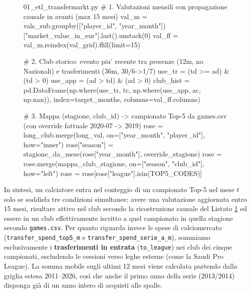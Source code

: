 \begin{figure}[!htb]
\centering
\begin{carbonwindow}{01\_etl\_transfermarkt.py}
# 1. Valutazioni mensili con propagazione causale in avanti (max 15 mesi)
val_m = vals_sub.groupby(["player_id", "year_month"])["market_value_in_eur"].last().unstack(0)
val_ff = val_m.reindex(val_grid).ffill(limit=15)

# 2. Club storico: evento piu' recente tra presenze (12m, no Nazionali) e trasferimenti (36m, 30/6->1/7)
use_tr = (td >= ad) & (td > 0)
use_app = (ad > td) & (ad > 0)
club_hist = pd.DataFrame(np.where(use_tr, tc, np.where(use_app, ac, np.nan)),
                         index=target_months, columns=val_ff.columns)

# 3. Mappa (stagione, club_id) -> campionato Top-5 da games.csv (con override fattuale 2020-07 -> 2019)
rose = long_club.merge(long_val, on=["year_month", "player_id"], how="inner")
rose["season"] = stagione_da_mese(rose["year_month"], override_stagione)
rose = rose.merge(mappa_club_stagione, on=["season", "club_id"], how="left")
rose = rose[rose["league"].isin(TOP5_CODES)]
\end{carbonwindow}
\label{lst:etl_ricostruzione}
\end{figure}

In sintesi, un calciatore entra nel conteggio di un campionato Top-5 nel mese $t$ solo se soddisfa tre condizioni simultanee: avere una valutazione aggiornata entro 15 mesi, risultare attivo nel club secondo la ricostruzione causale del Listato \ref{lst:etl_ricostruzione} ed essere in un club effettivamente iscritto a quel campionato in quella stagione secondo \texttt{games.csv}. Per quanto riguarda invece le spese di calciomercato (\texttt{transfer\_spend\_top5\_m} e \texttt{transfer\_spend\_serie\_a\_m}), sommiamo esclusivamente i \textbf{trasferimenti in entrata} (\texttt{to\_league}) nei club dei cinque campionati, escludendo le cessioni verso leghe esterne (come la Saudi Pro League). La somma mobile sugli ultimi 12 mesi viene calcolata partendo dalla griglia estesa 2011--2026, così che anche il primo anno della serie (2013/2014) disponga già di un anno intero di acquisti alle spalle.

